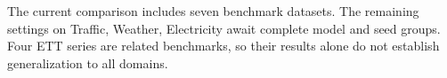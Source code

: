 The current comparison includes seven benchmark datasets. The remaining settings on Traffic, Weather, Electricity await complete model and seed groups. Four ETT series are related benchmarks, so their results alone do not establish generalization to all domains.
